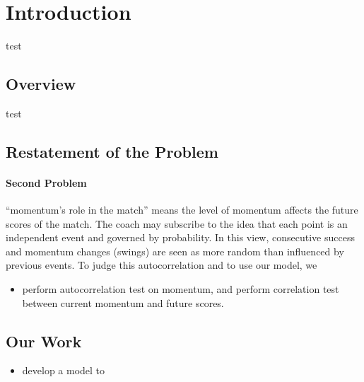 \setcounter{page}{1}

\section{Introduction}

test

\subsection{Overview}

test

\subsection{Restatement of the Problem}

\paragraph{Second Problem}

``momentum's role in the match'' means the level of momentum affects the future scores of the match.
The coach may subscribe to the idea that each point is an independent event and governed by probability.
In this view, consecutive success and momentum changes (swings) are seen as more random than influenced by previous events.
To judge this autocorrelation and to use our model, we 

\begin{itemize}
    \item perform autocorrelation test on momentum, and perform correlation test between current momentum and future scores.
\end{itemize}

\subsection{Our Work}

\begin{itemize}
    \item develop a model to 
\end{itemize}